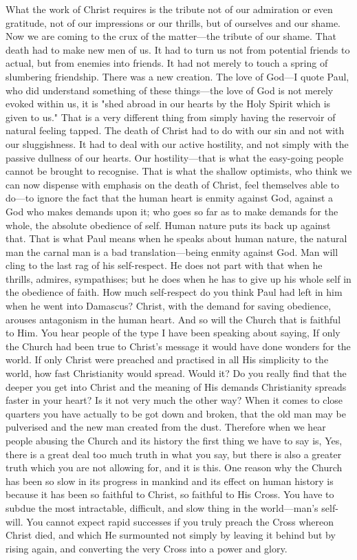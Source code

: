 \documentclass[12pt,letterpaper,oneside]{book}
\begin{document}
What the work of Christ requires is the 
tribute not of our admiration or even gratitude, 
not of our impressions or our thrills, but 
of ourselves and our shame. Now we are coming 
to the crux of the matter---the tribute of our 
shame. That death had to make new men of 
us. It had to turn us not from potential friends 
to actual, but from enemies into friends. It 
had not merely to touch a spring of slumbering 
friendship. There was a new creation. The 
love of God---I quote Paul, who did understand 
something of these things---the love of God is 
not merely evoked within us, it is "shed abroad 
in our hearts by the Holy Spirit which is given 
to us." That is a very different thing from 
simply having the reservoir of natural feeling 
tapped. The death of Christ had to do with 
our sin and not with our sluggishness. It had 
to deal with our active hostility, and not simply 
with the passive dullness of our hearts. Our 
hostility---that is what the easy-going people
cannot be brought to recognise. That is what 
the shallow optimists, who think we can now 
dispense with emphasis on the death of Christ, 
feel themselves able to do---to ignore the fact 
that the human heart is enmity against God, 
against a God who makes demands upon it; 
who goes so far as to make demands for 
the whole, the absolute obedience of self. 
Human nature puts its back up against that. 
That is what Paul means when he speaks 
about human nature, the natural man the 
carnal man is a bad translation---being enmity 
against God. Man will cling to the last rag of 
his self-respect. He does not part with that 
when he thrills, admires, sympathises; but he
does when he has to give up his whole self in 
the obedience of faith. How much self-respect 
do you think Paul had left in him when he went 
into Damascus? Christ, with the demand for 
saving obedience, arouses antagonism in the 
human heart. And so will the Church that 
is faithful to Him. You hear people of the 
type I have been speaking about saying, If 
only the Church had been true to Christ's 
message it would have done wonders for the 
world. If only Christ were preached and practised 
in all His simplicity to the world, how fast 
Christianity would spread. Would it? Do you
really find that the deeper you get into Christ 
and the meaning of His demands Christianity 
spreads faster in your heart? Is it not very 
much the other way? When it comes to close 
quarters you have actually to be got down and 
broken, that the old man may be pulverised and 
the new man created from the dust. Therefore 
when we hear people abusing the Church 
and its history the first thing we have to say 
is, Yes, there is a great deal too much truth 
in what you say, but there is also a greater 
truth which you are not allowing for, and it 
is this. One reason why the Church has 
been so slow in its progress in mankind and 
its effect on human history is because it has 
been so faithful to Christ, so faithful to His 
Cross. You have to subdue the most intractable, 
difficult, and slow thing in the world---man's 
self-will. You cannot expect rapid successes 
if you truly preach the Cross whereon 
Christ died, and which He surmounted not 
simply by leaving it behind but by rising again, 
and converting the very Cross into a power
and glory. 
\end{document}
